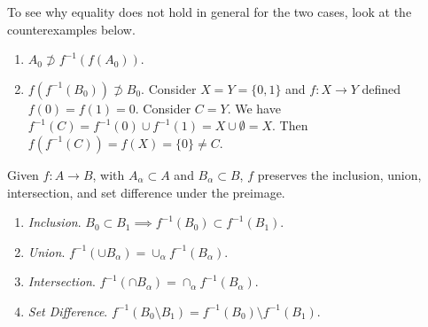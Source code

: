   \begin{example}[Counterexamples]
    To see why equality does not hold in general for the two cases, look at the counterexamples below. 
    \begin{enumerate}
      \item $A_0 \not\supset f^{-1} (f(A_0))$. 
      \item $f(f^{-1}(B_0)) \not\supset B_0$. Consider $X = Y = \{0, 1\}$ and $f: X \rightarrow Y$ defined $f(0) = f(1) = 0$. Consider $C = Y$. We have $f^{-1} (C) = f^{-1} (0) \cup f^{-1} (1) = X \cup \emptyset = X$. Then $f(f^{-1} (C)) = f(X) = \{0\} \neq C$. 
    \end{enumerate}
  \end{example}

  \begin{theorem}
    Given $f: A \rightarrow B$, with $A_\alpha \subset A$ and $B_\alpha \subset B$, $f$ preserves the inclusion, union, intersection, and set difference under the preimage. 
    \begin{enumerate}
      \item \textit{Inclusion}. $B_0 \subset B_1 \implies f^{-1} (B_0) \subset f^{-1} (B_1)$. 
      \item \textit{Union}. $f^{-1} (\cup B_\alpha) = \cup_\alpha f^{-1} (B_\alpha)$. 
      \item \textit{Intersection}. $f^{-1} (\cap B_\alpha) = \cap_\alpha f^{-1} (B_\alpha)$.
      \item \textit{Set Difference}. $f^{-1}(B_0 \setminus B_1) = f^{-1} (B_0) \setminus f^{-1} (B_1)$. 
    \end{enumerate}
  \end{theorem} 
